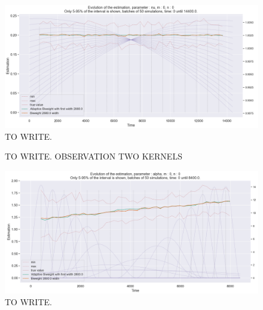 \begin{figure}
\centering
\includegraphics[width = 0.90 \textwidth]{../imag/chap3/0/C.png}
\caption{TO WRITE.}
\label{fig:first_estimate_0_nu}
\end{figure}











\begin{figure}
\centering
{} 
\caption{TO WRITE. OBSERVATION TWO KERNELS}
\label{fig:TEST}
\end{figure}

\begin{figure}
\centering
\includegraphics[width = 0.90 \textwidth]{../imag/chap3/1/D.png}
\caption{TO WRITE.}
\label{fig:first_estimate_1_alpha}
\end{figure}

